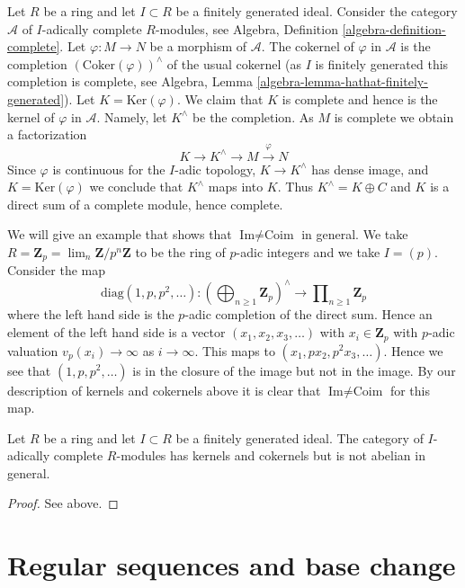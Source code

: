 \noindent
Let $R$ be a ring and let $I \subset R$ be a finitely generated ideal.
Consider the category $\mathcal{A}$ of $I$-adically complete
$R$-modules, see
Algebra, Definition \ref{algebra-definition-complete}.
Let $\varphi : M \to N$ be a morphism of $\mathcal{A}$.
The cokernel of $\varphi$ in $\mathcal{A}$ is the completion
$(\text{Coker}(\varphi))^\wedge$ of the usual cokernel
(as $I$ is finitely generated this completion is complete, see
Algebra, Lemma \ref{algebra-lemma-hathat-finitely-generated}).
Let $K = \text{Ker}(\varphi)$. We claim that $K$ is complete and
hence is the kernel of $\varphi$ in $\mathcal{A}$. Namely, let
$K^\wedge$ be the completion. As $M$ is complete we obtain a factorization
$$
K \to K^\wedge \to M \xrightarrow{\varphi} N
$$
Since $\varphi$ is continuous for the $I$-adic topology, $K \to K^\wedge$
has dense image, and $K = \text{Ker}(\varphi)$ we conclude that $K^\wedge$
maps into $K$. Thus $K^\wedge = K \oplus C$ and $K$ is a direct sum
of a complete module, hence complete.

\medskip\noindent
We will give an example that shows that $\text{Im} \not = \text{Coim}$
in general. We take $R = \mathbf{Z}_p = \lim_n \mathbf{Z}/p^n\mathbf{Z}$
to be the ring of $p$-adic integers and we take $I = (p)$.
Consider the map
$$
\text{diag}(1, p, p^2, \ldots) :
\left(\bigoplus\nolimits_{n \geq 1} \mathbf{Z}_p\right)^\wedge
\longrightarrow
\prod\nolimits_{n \geq 1} \mathbf{Z}_p
$$
where the left hand side is the $p$-adic completion of the direct sum.
Hence an element of the left hand side is a vector $(x_1, x_2, x_3, \ldots)$
with $x_i \in \mathbf{Z}_p$ with $p$-adic valuation $v_p(x_i) \to \infty$ as
$i \to \infty$. This maps to $(x_1, px_2, p^2x_3, \ldots)$. Hence we see
that $(1, p, p^2, \ldots)$ is in the closure of the image but not in
the image. By our description of kernels and cokernels above it is
clear that $\text{Im} \not = \text{Coim}$ for this map.

\begin{lemma}
\label{lemma-complete-modules-not-abelian}
Let $R$ be a ring and let $I \subset R$ be a finitely generated ideal.
The category of $I$-adically complete $R$-modules has kernels and
cokernels but is not abelian in general.
\end{lemma}

\begin{proof}
See above.
\end{proof}


\section{Regular sequences and base change}
\label{section-regular-base-change}

